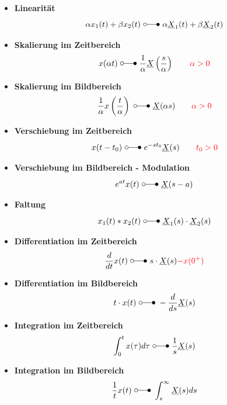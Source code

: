 \begin{mdframed}[style=exercise,nobreak=false]
	\begin{itemize}
		\item \textbf{Linearität}
		      \[
			      \alpha x_1(t) + \beta x_2(t) \ \laplace\  \alpha \underline{X}_1(t) + \beta \underline{X}_2(t)
		      \]
		      \vspace{-1.5em}
		\item \textbf{Skalierung im Zeitbereich}
		      \[
			      x(\alpha t) \ \laplace\  \frac{1}{\alpha} \underline{X}\left(\frac{s}{\alpha}\right) \qquad \color{red}{\alpha > 0}
		      \]
		      \vspace{-1.5em}
		\item \textbf{Skalierung im Bildbereich}
		      \[
			      \frac{1}{\alpha}x\left(\frac{t}{\alpha}\right)\ \laplace\ \underline{X}(\alpha s) \qquad \color{red}{\alpha > 0}
		      \]
		      \vspace{-1.5em}
		\item \textbf{Verschiebung im Zeitbereich}
		      \[
			      x(t-t_0)\ \laplace\ e^{-st_0} \underline{X}(s) \qquad \color{red}{t_0 > 0}
		      \]
		      \vspace{-1.5em}
		\item \textbf{Verschiebung im Bildbereich - Modulation}
		      \[
			      e^{at}x(t) \ \laplace\ \underline{X}(s-a)
		      \]
		      \vspace{-1.5em}
		\item \textbf{Faltung}
		      \[
			      x_1(t)*x_2(t) \ \laplace\ \underline{X}_1(s)\cdot \underline{X}_2(s)
		      \]
		      \vspace{-1.5em}
		\item \textbf{Differentiation im Zeitbereich}
		      \[
			      \frac{d}{dt}x(t) \ \laplace\ s\cdot\underline{X}(s)\color{red}{-x(0^+)}
		      \]
		      \vspace{-1.5em}
		\item \textbf{Differentiation im Bildbereich}
		      \[
			      t\cdot x(t) \ \laplace\ -\frac{d}{ds}\underline{X}(s)
		      \]
		      \vspace{-1.5em}
		\item \textbf{Integration im Zeitbereich}
		      \[
			      \int_0^t x(\tau)d\tau \ \laplace\ \frac{1}{s}\underline{X}(s)
		      \]
		      \vspace{-1.5em}
		\item \textbf{Integration im Bildbereich}
		      \[
			      \frac{1}{t}x(t) \ \laplace\ \int_s^\infty\underline{X}(s)ds
		      \]
	\end{itemize}
\end{mdframed}
